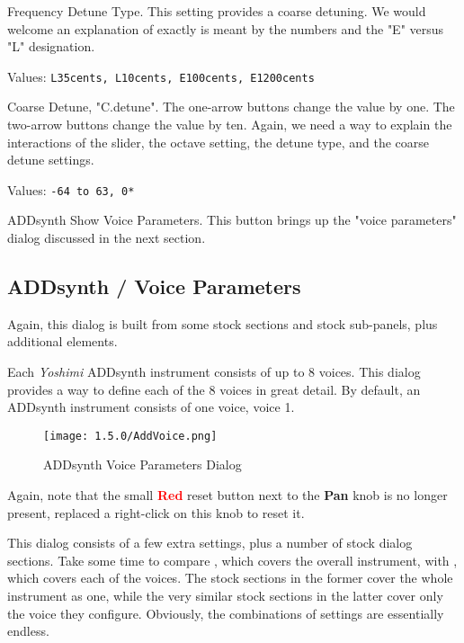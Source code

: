    Frequency Detune Type.
   This setting provides a coarse detuning.
   We would welcome an explanation of exactly is meant by the numbers and
   the "E" versus "L" designation.

   Values: \texttt{L35cents, L10cents, E100cents, E1200cents}

   Coarse Detune, "C.detune".
   The one-arrow buttons change the value by one.
   The two-arrow buttons change the value by ten.
   Again, we need a way to explain the interactions of the slider, the
   octave setting, the detune type, and the coarse detune settings.

   Values: \texttt{-64 to 63, 0*}

   ADDsynth Show Voice Parameters.
   This button brings up the "voice parameters" dialog discussed in the next
   section.

\subsection{ADDsynth / Voice Parameters}
\label{subsec:addsynth_voice_parameters}

   Again, this dialog is built from some stock sections and stock
   sub-panels, plus additional elements.

   Each \textsl{Yoshimi} ADDsynth instrument consists of up to 8 voices.
   This dialog provides a way to define each of the 8 voices in great
   detail.  By default, an ADDsynth instrument consists of one voice, voice 1.

\begin{figure}[H]
   \centering 
   \texttt{[image: 1.5.0/AddVoice.png]}
   \caption{ADDsynth Voice Parameters Dialog}
   \label{fig:addsynth_voice_parameters_dialog}
\end{figure}

   Again, note that the small \textbf{\textcolor{red}{Red}}
   reset button next to the \textbf{Pan} knob is no longer present,
   replaced a right-click on this knob to reset it.

   This dialog consists of a few extra settings, plus a number of
   stock dialog sections.  Take some time to compare
   ,
   which covers the overall instrument, with 
   ,
   which covers each of the voices.
   The stock sections in the former cover the whole instrument as one,
   while the very similar stock sections in the latter cover only the
   voice they configure.
   Obviously, the combinations of settings are essentially endless.

